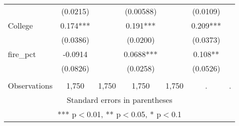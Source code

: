 \begin{tabular}{lcccccc}
 & (0.0215) &  & (0.00588) &  & (0.0109) &  \\
College & 0.174*** &  & 0.191*** &  & 0.209*** &  \\
 & (0.0386) &  & (0.0200) &  & (0.0373) &  \\
fire\_pct & -0.0914 &  & 0.0688*** &  & 0.108** &  \\
 & (0.0826) &  & (0.0258) &  & (0.0526) &  \\
 &  &  &  &  &  &  \\
 Observations & 1,750 & 1,750 & 1,750 & 1,750 & . & . \\ \hline
\multicolumn{7}{c}{ Standard errors in parentheses} \\
\multicolumn{7}{c}{ *** p$<$0.01, ** p$<$0.05, * p$<$0.1} \\
\end{tabular}
